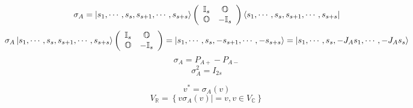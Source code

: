 \documentclass[aps,preprint]{revtex4}%
\begin{document}
\begin{equation}
\sigma_{A}=\left\vert s_{1},\cdots,s_{s},s_{s+1},\cdots,s_{s+s}\right\rangle
\left(
\begin{array}
[c]{cc}%
\mathbb{I}_{s} & \mathbb{O}\\
\mathbb{O} & -\mathbb{I}_{s}%
\end{array}
\right)  \left\langle s_{1},\cdots,s_{s},s_{s+1},\cdots,s_{s+s}\right\vert
\end{equation}%
\begin{equation}
\sigma_{A}\left\vert s_{1},\cdots,s_{s},s_{s+1},\cdots,s_{s+s}\right\rangle
\left(
\begin{array}
[c]{cc}%
\mathbb{I}_{s} & \mathbb{O}\\
\mathbb{O} & -\mathbb{I}_{s}%
\end{array}
\right)  =\left\vert s_{1},\cdots,s_{s},-s_{s+1},\cdots,-s_{s+s}\right\rangle
=\left\vert s_{1},\cdots,s_{s},-J_{A}s_{1},\cdots,-J_{A}s_{s}\right\rangle
\end{equation}%
\begin{equation}
\sigma_{A}=P_{A+}-P_{A-}%
\end{equation}%
\begin{equation}
\sigma_{A}^{2}=I_{2s}%
\end{equation}


\bigskip%
\begin{equation}
v^{\ast}=\sigma_{A}\left(  v\right)
\end{equation}%
\begin{equation}
V_{\mathbb{R}}=\left\{  v\left.  \sigma_{A}\left(  v\right)  \right\vert
=v,v\in V_{\mathbb{C}}\right\}
\end{equation}


\bigskip%
\end{document}
